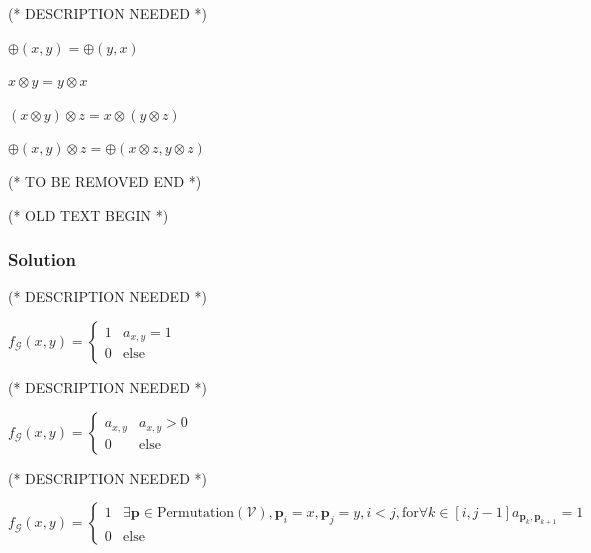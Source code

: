 \documentclass{article}
\begin{document}
(* DESCRIPTION NEEDED *)


\item \(\oplus (x,y)=\oplus (y,x)\)


\item \(x\otimes y=y\otimes x\)


\item \((x\otimes y)\otimes z=x\otimes (y\otimes z)\)


\item \(\oplus (x,y)\otimes z=\oplus (x\otimes z,y\otimes z)\)



(* TO BE REMOVED END *)



(* OLD TEXT BEGIN *)


\subsubsection{Solution}





(* DESCRIPTION NEEDED *)

\(f_{\mathcal{G}}(x,y)=\begin{cases}
 1 & a_{x,y}=1 \\
 0 & \text{else}
\end{cases}\)





(* DESCRIPTION NEEDED *)

\(f_{\mathcal{G}}(x,y)=\begin{cases}
 a_{x,y} & a_{x,y}>0 \\
 0 & \text{else}
\end{cases}\)





(* DESCRIPTION NEEDED *)

\(f_{\mathcal{G}}(x,y)=\begin{cases}
 1 & \exists \pmb{p}\in \text{Permutation}(\mathcal{V}),\pmb{p}_i=x,\pmb{p}_j=y,i<j,\text{for} \forall k\in [i,j-1] a_{\pmb{p}_k,\pmb{p}_{k+1}}=1
\\
 0 & \text{else}
\end{cases}\)


\end{document}
